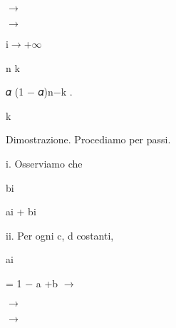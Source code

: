 \documentclass[a4paper,portrait,12pt]{article}
\begin{document}
$\rightarrow$


$\rightarrow$


\begin{flushleft}
i$\rightarrow$+$\infty$
\end{flushleft}





\begin{flushleft}
n k
\end{flushleft}


\begin{flushleft}
𝛼 (1 $-$ 𝛼)n$-$k .
\end{flushleft}


\begin{flushleft}
k
\end{flushleft}





\begin{flushleft}
Dimostrazione. Procediamo per passi.
\end{flushleft}


\begin{flushleft}
i. Osserviamo che
\end{flushleft}





\begin{flushleft}
bi
\end{flushleft}


\begin{flushleft}
ai + bi
\end{flushleft}





\begin{flushleft}
ii. Per ogni c, d costanti,
\end{flushleft}





\begin{flushleft}
ai
\end{flushleft}





\begin{flushleft}
= 1 $-$ a +b $\rightarrow$
\end{flushleft}


$\rightarrow$


$\rightarrow$
\end{document}
